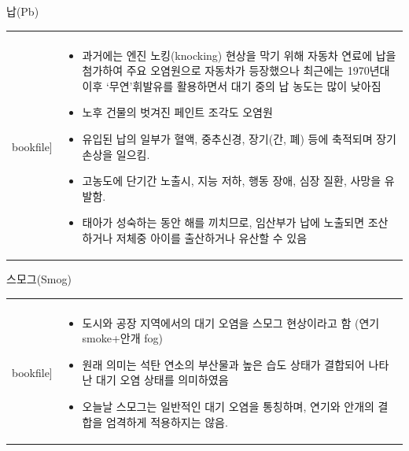 \begin{frame}[t]{납(Pb)	}
	\begin{tabular}{ll}
		\begin{minipage}[t]{0.3\textwidth}\scriptsize
			\begin{figure}[t]
				\texttt{[image: \\bookfile]}
			\end{figure}
		\end{minipage}	
		&
		\begin{minipage}[t]{0.65\textwidth} \scriptsize	
			\begin{itemize}
				\item 과거에는 엔진 노킹(knocking) 현상을 막기 위해 자동차 연료에 납을 첨가하여 주요 오염원으로 자동차가 등장했으나 최근에는 1970년대 이후 ‘무연’휘발유를 활용하면서 대기 중의 납 농도는 많이 낮아짐
				\item 노후 건물의 벗겨진 페인트 조각도 오염원
				\item 유입된 납의 일부가 혈액, 중추신경, 장기(간, 폐) 등에 축적되며 장기 손상을 일으킴.
				\item 고농도에 단기간 노출시, 지능 저하, 행동 장애, 심장 질환, 사망을 유발함. 
				\item 태아가 성숙하는 동안 해를 끼치므로, 임산부가 납에 노출되면 조산하거나 저체중 아이를  출산하거나 유산할 수 있음
				
			\end{itemize}

		\end{minipage}
	\end{tabular}
\end{frame}





\begin{frame}[t]{스모그(Smog)}
	\begin{tabular}{ll}
		\begin{minipage}[t]{0.3\textwidth}\scriptsize
			\begin{figure}[t]
				\texttt{[image: \\bookfile]}
			\end{figure}
		\end{minipage}	
		&
		\begin{minipage}[t]{0.65\textwidth} \scriptsize	
			\begin{itemize}
				\item 도시와 공장 지역에서의 대기 오염을 스모그 현상이라고 함 (연기 smoke+안개 fog)
				\item 원래 의미는 석탄 연소의 부산물과 높은 습도 상태가 결합되어 나타난 대기 오염 상태를  의미하였음
				\item 오늘날 스모그는 일반적인 대기 오염을 통칭하며, 연기와 안개의 결합을 엄격하게 적용하지는 않음.
				
				
			\end{itemize}

		\end{minipage}
	\end{tabular}
\end{frame}



